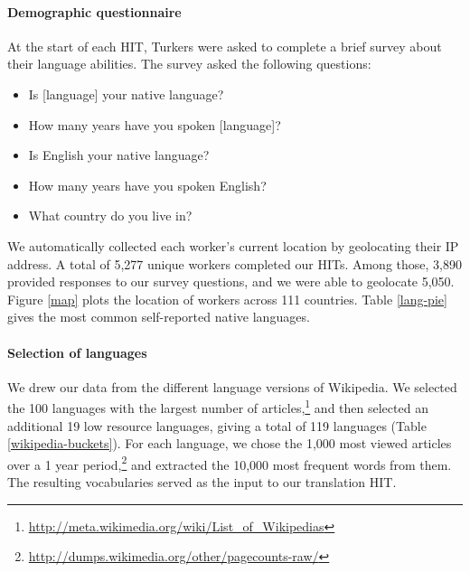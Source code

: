 \documentclass[11pt]{article}
\begin{document}
\paragraph{Demographic questionnaire}

At the start of each HIT, Turkers were asked to complete a brief survey about their language abilities. The survey asked the following questions:
\begin{itemize}
\item Is [language] your native language? 
\item How many years have you spoken [language]? 
\item Is English your native language? 
\item How many years have you spoken English?
\item What country do you live in?
\end{itemize}
We automatically collected each worker's current location by geolocating their IP address.  A total of 5,277 unique workers completed our HITs.  Among those, 3,890 provided responses to our survey questions, and we were able to geolocate 5,050.  Figure \ref{map} plots the location of workers across 111 countries.  Table \ref{lang-pie} gives the most common self-reported native languages. 

\paragraph{Selection of languages}

We drew our data from the different language versions of Wikipedia.   We selected the 100 languages with the largest number of articles,\footnote{\url{http://meta.wikimedia.org/wiki/List_of_Wikipedias}} and then selected an additional 19 low resource languages, giving a total of 119 languages (Table \ref{wikipedia-buckets}). For each language, we chose the 1,000 most viewed articles over a 1 year period,\footnote{\url{http://dumps.wikimedia.org/other/pagecounts-raw/}} and extracted the 10,000 most frequent words from them. The resulting vocabularies served as the input to our translation HIT.
\end{document}
